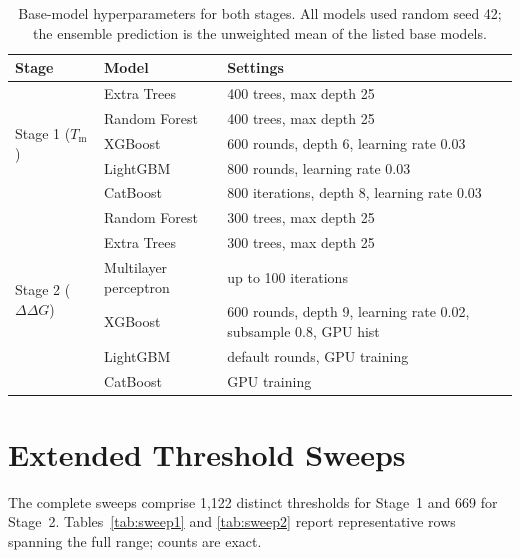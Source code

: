 \documentclass[journal,article,submit,moreauthors]{Definitions/mdpi}
\newcommand{\ddg}{\ensuremath{\Delta\Delta G}}
\newcommand{\Tm}{\ensuremath{T_\mathrm{m}}}
\begin{document}
\begin{table}[H]
\caption{Base-model hyperparameters for both stages. All models used random seed 42; the
ensemble prediction is the unweighted mean of the listed base models.}
\label{tab:hyper}
\begin{tabular}{lll}
\toprule
\textbf{Stage} & \textbf{Model} & \textbf{Settings}\\
\midrule
\multirow{5}{*}{Stage 1 (\Tm)}
 & Extra Trees   & 400 trees, max depth 25\\
 & Random Forest & 400 trees, max depth 25\\
 & XGBoost       & 600 rounds, depth 6, learning rate 0.03\\
 & LightGBM      & 800 rounds, learning rate 0.03\\
 & CatBoost      & 800 iterations, depth 8, learning rate 0.03\\
\midrule
\multirow{6}{*}{Stage 2 (\ddg)}
 & Random Forest & 300 trees, max depth 25\\
 & Extra Trees   & 300 trees, max depth 25\\
 & Multilayer perceptron & up to 100 iterations\\
 & XGBoost       & 600 rounds, depth 9, learning rate 0.02, subsample 0.8, GPU hist\\
 & LightGBM      & default rounds, GPU training\\
 & CatBoost      & GPU training\\
\bottomrule
\end{tabular}
\end{table}

\section{Extended Threshold Sweeps}
\label{app:sweeps}

The complete sweeps comprise 1{,}122 distinct thresholds for Stage~1 and 669 for Stage~2.
Tables~\ref{tab:sweep1} and \ref{tab:sweep2} report representative rows spanning the full
range; counts are exact.
\end{document}

